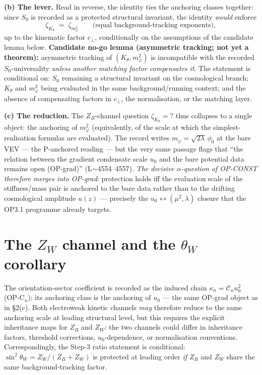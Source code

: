 \documentclass[11pt,a4paper]{article}
\begin{document}
\textbf{(b) The lever.} Read in reverse, the identity ties the anchoring classes
together: since $S_0$ is recorded as a protected structural invariant, the
identity \emph{would} enforce
\[
\zeta_{K_\theta}\;=\;\zeta_{m_\varphi^2}
\qquad\text{(equal background-tracking exponents)},
\]
up to the kinematic factor $c_\perp$, conditionally on the assumptions of the
candidate lemma below. \textbf{Candidate no-go lemma (asymmetric tracking; not yet
a theorem):} asymmetric tracking of $(K_\theta,m_\varphi^2)$ is incompatible with
the recorded $S_0$-universality \emph{unless another matching factor compensates
it}. The statement is conditional on: $S_0$ remaining a structural invariant on
the cosmological branch; $K_\theta$ and $m_\varphi^2$ being evaluated in the same
background/running context; and the absence of compensating factors in $c_\perp$,
the normalisation, or the matching layer.

\textbf{(c) The reduction.} The $Z_B$-channel question $\zeta_{K_\theta}=?$ thus
collapses to a single object: the anchoring of $m_\varphi^2$ (equivalently, of the
scale at which the simplest-realisation formulas are evaluated). The record writes
$m_\varphi=\sqrt{2\lambda}\,\phi_0$ at the bare VEV --- the P-anchored reading ---
but the very same passage flags that ``the relation between the gradient condensate
scale $u_0$ and the bare potential data remains open (OP-grad)''
(L$\sim$4554--4557). \emph{The decisive $\alpha$-question of OP-CONST therefore
merges into OP-grad}: protection holds iff the evaluation scale of the
stiffness/mass pair is anchored to the bare data rather than to the drifting
cosmological amplitude $u(z)$ --- precisely the $u_0\!\leftrightarrow\!(\mu^2,
\lambda)$ closure that the OP3.1 programme already targets.

\section{The $Z_W$ channel and the $\theta_W$ corollary}
The orientation-sector coefficient is recorded as the induced chain
$\kappa_n=\mathcal C_n u_0^2$ (OP-C$_n$); its anchoring class is the anchoring of
$u_0$ --- the same OP-grad object as in \S2(c). Both electroweak kinetic channels
\emph{may} therefore reduce to the same anchoring scale at leading structural
level, but this requires the explicit inheritance maps for $Z_B$ and $Z_W$: the
two channels could differ in inheritance factors, threshold corrections,
$u_0$-dependence, or normalisation conventions. Correspondingly, the Step-3 ratio
statement is conditional: $\sin^2\theta_W=Z_W/(Z_B+Z_W)$ is protected at leading
order \emph{if} $Z_B$ and $Z_W$ share the same background-tracking factor.
\end{document}
